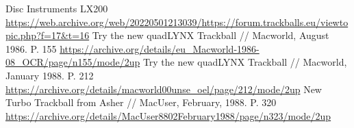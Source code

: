 \documentclass[11pt, a4paper]{article}
\begin{document}
\begin{thebibliography}{9}
 Disc Instruments LX200 \url{https://web.archive.org/web/20220501213039/https://forum.trackballs.eu/viewtopic.php?f=17&t=16}
 Try the new quadLYNX Trackball // Macworld, August 1986. P. 155  \url{https://archive.org/details/eu_Macworld-1986-08_OCR/page/n155/mode/2up}
 Try the new quadLYNX Trackball // Macworld, January 1988. P. 212 \url{https://archive.org/details/macworld00unse_oel/page/212/mode/2up}
 New Turbo Trackball from Asher // MacUser, February, 1988. P. 320 
\url{https://archive.org/details/MacUser8802February1988/page/n323/mode/2up}
\end{thebibliography}
\end{document}
